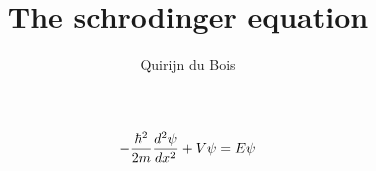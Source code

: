 \documentclass{article}
\title{The schrodinger equation}
\author{Quirijn du Bois}
\begin{document}
\maketitle

\[
-\frac{\hbar^2}{2m} \frac{d^2 \psi}{dx^2} + V\psi = E\psi\\
\]
\end{document}
